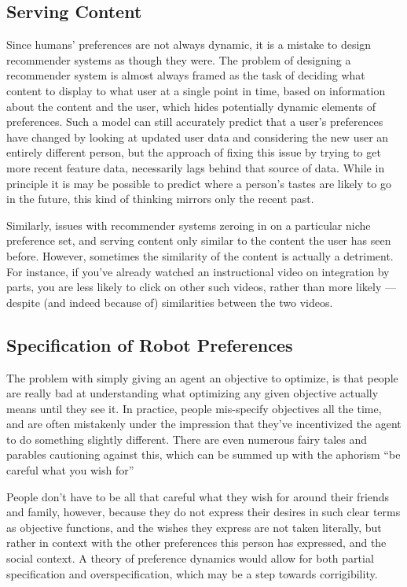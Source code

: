 \documentclass{article}
\theoremstyle{plain}
\theoremstyle{definition}
\theoremstyle{remark}
\begin{document}
	
	\subsection{Serving Content}
	Since humans' preferences are not always dynamic, it is a mistake to design recommender systems as though they were. The problem of designing a recommender system is almost always framed as the task of deciding what content to display to what user at a single point in time, based on information about the content and the user, which hides potentially dynamic elements of preferences. Such a model can still accurately predict that a user's preferences have changed by looking at updated user data and considering the new user an entirely different person, but the approach of fixing this issue by trying to get more recent feature data, necessarily lags behind that source of data. While in principle it is may be possible to predict where a person's tastes are likely to go in the future, this kind of thinking mirrors only the recent past.
	
	Similarly, issues with recommender systems zeroing in on a particular niche preference set, and serving content only similar to the content the user has seen before. However, sometimes the similarity of the content is actually a detriment. For instance, if you've already watched an instructional video on integration by parts, you are less likely to click on other such videos, rather than more likely --- despite (and indeed because of) similarities between the two videos.
	


	

	
	\subsection{Specification of Robot Preferences}
	The problem with simply giving an agent an objective to optimize, is that people are really bad at understanding what optimizing any given objective actually means until they see it. In practice, people mis-specify objectives all the time, and are often mistakenly under the impression that they've incentivized the agent to do something slightly different. There are even numerous fairy tales and parables cautioning against this, which can be summed up with the aphorism ``be careful what you wish for''
	
	People don't have to be all that careful what they wish for around their friends and family, however, because they do not express their desires in such clear terms as objective functions, and the wishes they express are not taken literally, but rather in context with the other preferences this person has expressed, and the social context. A theory of preference dynamics would allow for both partial specification and overspecification, which may be a step towards corrigibility.
	
\end{document}
